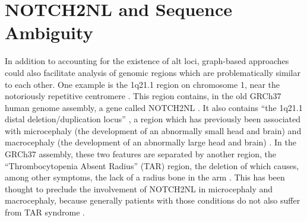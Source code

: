 \documentclass[11pt,proposal]{ucthesis}
\begin{document}

    
    
    
        
        
    

        
    

\section{NOTCH2NL and Sequence Ambiguity}
\label{sec:notch}
    
In addition to accounting for the existence of alt loci, graph-based approaches could also facilitate analysis of genomic regions which are problematically similar to each other. One example is the 1q21.1 region on chromosome 1, near the notoriously repetitive centromere \cite{jacobs2014recently}. This region contains, in the old GRCh37 human genome assembly, a gene called NOTCH2NL \cite{jacobs2014recently}. It also contains ``the 1q21.1 distal deletion/duplication locus'' \cite{jacobs2014recently}, a region which has previously been associated with microcephaly (the development of an abnormally small head and brain) and macrocephaly (the development of an abnormally large head and brain) \cite{jacobs2014recently}. In the GRCh37 assembly, these two features are separated by another region, the ``Thrombocytopenia Absent Radius'' (TAR) region, the deletion of which causes, among other symptoms, the lack of a radius bone in the arm \cite{jacobs2014recently}. This has been thought to preclude the involvement of NOTCH2NL in microcephaly and macrocephaly, because generally patients with those conditions do not also suffer from TAR syndrome \cite{jacobs2014recently}.
\end{document}
